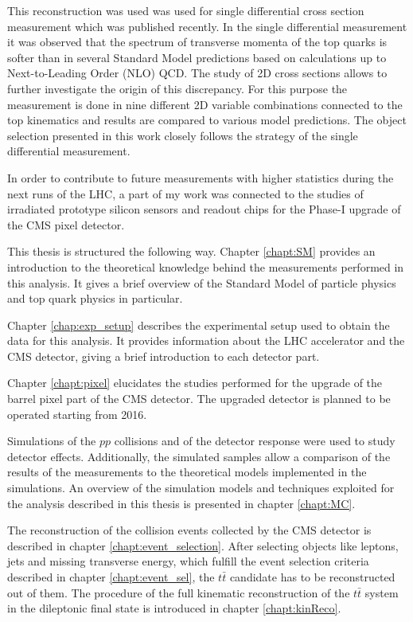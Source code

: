 This reconstruction was used was used for single differential cross section measurement \cite{Khachatryan:2015oqa} which was 
published recently. In the single differential measurement it was observed that the spectrum of transverse momenta of the 
top quarks is softer than in several Standard Model predictions based on calculations up to Next-to-Leading Order (NLO) QCD. 
The study of 2D cross sections allows to further investigate the origin of this discrepancy. For this purpose the measurement 
is done in nine different 2D variable combinations connected to the top kinematics and results are compared to various model 
predictions. The object selection presented in this work closely follows the strategy of the single differential measurement.

In order to contribute to future measurements with higher statistics during
the next runs of the LHC, a part of my work was connected to the studies of irradiated
prototype silicon sensors and readout chips for the Phase-I upgrade of the CMS pixel detector.

This thesis is structured the following way. Chapter \ref{chapt:SM} provides an introduction to the theoretical
knowledge behind the measurements performed in this analysis. It gives a brief overview of the Standard
Model of particle physics and top quark physics in particular.

Chapter \ref{chap:exp_setup} describes the experimental setup used to obtain the data for this analysis.
It provides information about the LHC accelerator and the CMS detector, giving a brief introduction to each detector part.

Chapter \ref{chapt:pixel} elucidates the studies performed for the
upgrade of the barrel pixel part of the CMS detector. The upgraded detector is planned to be operated starting from 2016.

Simulations of the $pp$ collisions and of the detector response were used to study detector effects.
Additionally, the simulated samples allow a comparison of the results of the measurements to the theoretical models 
implemented in the simulations. An overview of the simulation models and techniques exploited for the analysis described 
in this thesis is presented in chapter \ref{chapt:MC}.

The reconstruction of the collision events collected by the CMS detector is described
in chapter \ref{chapt:event_selection}. After selecting objects like leptons, jets and missing transverse energy, which 
fulfill the event selection criteria described in chapter \ref{chapt:event_sel}, the $t\bar{t}$ candidate has to be reconstructed out
of them. The procedure of the full kinematic reconstruction of the $t\bar{t}$ system in the dileptonic final state is introduced
in chapter \ref{chapt:kinReco}.

